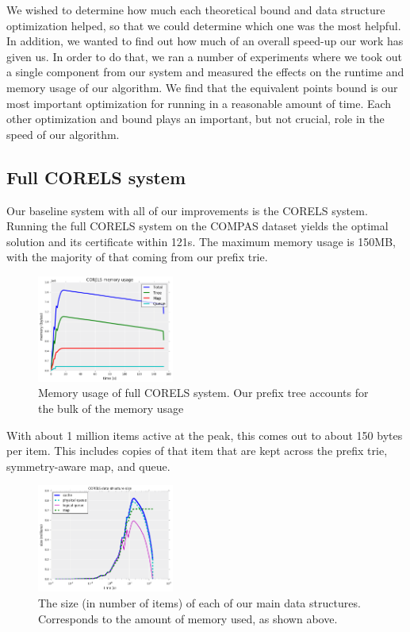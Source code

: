 We wished to determine how much each theoretical bound and data structure optimization helped, so that we could determine which one was the most helpful.
In addition, we wanted to find out how much of an overall speed-up our work has given us.
In order to do that, we ran a number of experiments where we took out a single component from our system and measured the effects on the runtime and memory usage of our algorithm.
We find that the equivalent points bound is our most important optimization for running in a reasonable amount of time.
Each other optimization and bound plays an important, but not crucial, role in the speed of our algorithm.

\subsection{Full CORELS system}

Our baseline system with all of our improvements is the CORELS system.
Running the full CORELS system on the COMPAS dataset yields the optimal solution and its certificate within 121s.
The maximum memory usage is 150MB, with the majority of that coming from our prefix trie.

\begin{figure}[t!]
\begin{center}
\includegraphics[width=0.4\textwidth]{figs/corels_mem.png}
\end{center}
\caption{Memory usage of full CORELS system. Our prefix tree accounts for the bulk of the memory usage}
\label{fig:corels-mem}
\end{figure}

With about 1 million items active at the peak, this comes out to about 150 bytes per item.
This includes copies of that item that are kept across the prefix trie, symmetry-aware map, and queue.

\begin{figure}[t!]
\begin{center}
\includegraphics[width=0.4\textwidth]{figs/corels_size.png}
\end{center}
\caption{The size (in number of items) of each of our main data structures. Corresponds to the amount of memory used, as shown above.}
\label{fig:corels-size}
\end{figure}

